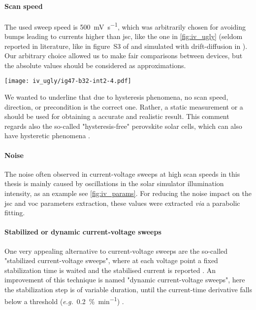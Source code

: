 	\paragraph{Scan speed}
	The used sweep speed is \SI{500}{\mV\per\s}, which was arbitrarily chosen for avoiding bumps leading to currents higher than \gls{jsc}, like the one in \cref{fig:iv_ugly} (seldom reported in literature, like in figure~S3 of \cite{Du2018} and simulated with drift-diffusion in \cite{Walter2018}).
	Our arbitrary choice allowed us to make fair comparisons between devices, but the absolute values should be considered as approximations.
	\begin{SCfigure}%
		\centering
		\texttt{[image: iv\_ugly/ig47-b32-int2-4.pdf]}
		\label{fig:iv_ugly}
	\end{SCfigure}
	We wanted to underline that due to hysteresis phenomena, no scan speed, direction, or precondition is the correct one.
	Rather, a static measurement or a  should be used for obtaining a accurate and realistic result.
	This comment regards also the so-called "hysteresis-free" perovskite solar cells, which can also have hysteretic phenomena \cite{Jacobs2018,Du2018}.

	\paragraph{Noise}
	The noise often observed in current-voltage sweeps at high scan speeds in this thesis is mainly caused by oscillations in the solar simulator illumination intensity, as an example see \cref{fig:iv_params}.
	For reducing the noise impact on the \gls{jsc} and \gls{voc} parameters extraction, these values were extracted \textsl{via} a parabolic fitting.

	\paragraph{Stabilized or dynamic current-voltage sweeps}
	One very appealing alternative to current-voltage sweeps are the so-called "stabilized current-voltage sweeps", where at each voltage point a fixed stabilization time is waited and the stabilised current is reported \cite{Unger2014, Christoforo2015}.
	An improvement of this technique is named "dynamic current-voltage sweeps", here the stabilization step is of variable duration, until the current\hyp{}time derivative falls below a threshold (\textsl{e.g.}\ \SI{0.2}{\%\per\minute}) \cite{Dunbar2017,Dunbar2017a}.

